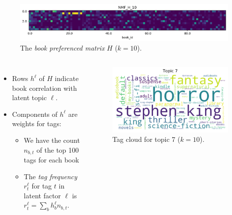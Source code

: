 \documentclass[handout]{beamer}
\begin{document}
\begin{frame}
 \begin{figure}[t]
    \centering
    \includegraphics[width=\textwidth, trim=3cm 0cm 0cm 0cm, clip]{../image/goodreads-models/nmf-H-10.png}
    \caption[NMF-H-10]{The \emph{book preferenced matrix} $H$ ($k=10$).}
     \label{fig:nmf-H-10}
\end{figure}

\begin{columns}
\begin{itemize}[<+->]
\item Rows $h^\ell$ of $H$ indicate book correlation with latent topic $\ell$.\vfill
\item Components of $h^\ell$ are weights for tags:\vfill
\begin{itemize}[<+->]
\item We have the count $n_{b,t}$ of the top 100 tags for each book\vfill
\item The \emph{tag frequency} $r^\ell_t$ for tag $t$ in latent factor $\ell$ is $\displaystyle r_t^\ell = \sum_{b} h^\ell_b n_{b,t}.$
\end{itemize}
\end{itemize}
\begin{figure}
\vspace{-20pt}
\centering
  \includegraphics[width=\linewidth]{../image/goodreads-topics-profiles-recommendations/tag-cloud-10-7.png}
  \caption[Tag Cloud for Topic 7 ($k=10$)]{Tag cloud for topic 7 ($k=10$).}
  \label{fig:tag-cloud-10-7}
\end{figure}
\end{columns}

\vfill
\end{frame}
\end{document}
